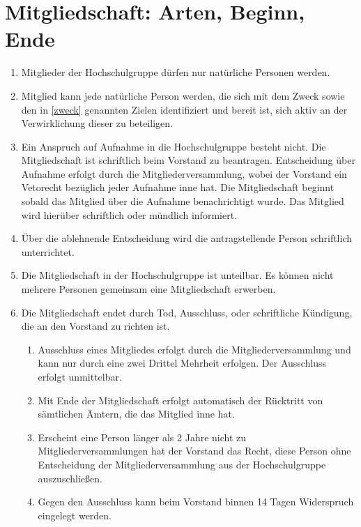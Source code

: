 \documentclass[11pt]{article}
\begin{document}
\section{Mitgliedschaft: Arten, Beginn, Ende}
\begin{enumerate}
	\item Mitglieder der Hochschulgruppe dürfen nur natürliche Personen werden.
	\item Mitglied kann jede natürliche Person werden, die sich mit dem Zweck sowie den in \ref{zweck} genannten Zielen identifiziert und bereit ist, sich aktiv an der Verwirklichung dieser zu beteiligen.
	\item Ein Anspruch auf Aufnahme in die Hochschulgruppe besteht nicht. Die Mitgliedschaft ist
	      schriftlich beim Vorstand zu beantragen. Entscheidung über Aufnahme erfolgt durch die Mitgliederversammlung, wobei der Vorstand ein Vetorecht bezüglich jeder Aufnahme inne hat. Die Mitgliedschaft beginnt sobald das Mitglied über die Aufnahme benachrichtigt wurde. Das Mitglied wird hierüber schriftlich oder mündlich informiert.
	\item Über die ablehnende Entscheidung wird die antragstellende Person schriftlich unterrichtet.
	\item Die Mitgliedschaft in der Hochschulgruppe ist unteilbar. Es können nicht mehrere Personen
	      gemeinsam eine Mitgliedschaft erwerben.
	\item Die Mitgliedschaft endet durch Tod, Ausschluss, oder schriftliche Kündigung, die an den Vorstand zu richten ist.
	      \begin{enumerate}
		      \item Ausschluss eines Mitgliedes erfolgt durch die Mitgliederversammlung und kann nur durch eine zwei Drittel Mehrheit erfolgen. Der Ausschluss erfolgt unmittelbar.
		      \item Mit Ende der Mitgliedschaft erfolgt automatisch der Rücktritt von sämtlichen Ämtern, die das Mitglied inne hat.
		      \item Erscheint eine Person länger als 2 Jahre nicht zu Mitgliederversammlungen hat der Vorstand das Recht, diese Person ohne Entscheidung der Mitgliederversammlung aus der Hochschulgruppe auszuschließen.
		      \item Gegen den Ausschluss kann beim Vorstand binnen 14 Tagen Widerspruch eingelegt werden.
	      \end{enumerate}
\end{enumerate}
\end{document}
